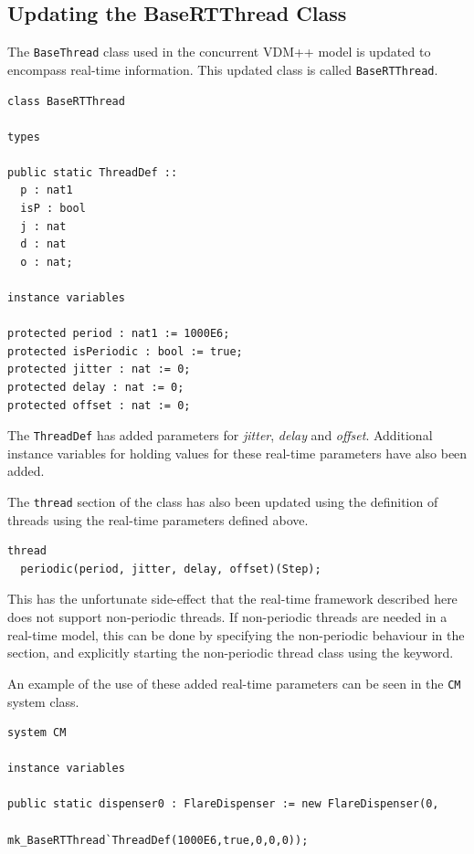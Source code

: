\documentclass{overturerepchap}
\begin{document}
\subsection{Updating the BaseRTThread Class}

The \texttt{BaseThread} class used in the concurrent VDM++ model is updated to encompass real-time information. This updated class is called \texttt{BaseRTThread}.

\begin{lstlisting}
class BaseRTThread

types

public static ThreadDef ::
  p : nat1
  isP : bool
  j : nat
  d : nat
  o : nat;
	
instance variables

protected period : nat1 := 1000E6;
protected isPeriodic : bool := true;
protected jitter : nat := 0;
protected delay : nat := 0;
protected offset : nat := 0;
\end{lstlisting}

The \texttt{ThreadDef} has added parameters for \emph{jitter}, \emph{delay} and \emph{offset}. Additional instance variables for holding values for these real-time parameters have also been added.

The \texttt{thread} section of the class has also been updated using the {\bf{}} definition of threads using the real-time parameters defined above.

\begin{lstlisting}
thread
  periodic(period, jitter, delay, offset)(Step);
\end{lstlisting}

This has the unfortunate side-effect that the real-time framework described here does not support non-periodic threads. If non-periodic threads are needed in a real-time model, this can be done by specifying the non-periodic behaviour in the {\bf{}} section, and explicitly starting the non-periodic thread class using the {\bf{}} keyword.

An example of the use of these added real-time parameters can be seen in the \texttt{CM} system class.

\begin{lstlisting}
system CM

instance variables

public static dispenser0 : FlareDispenser := new FlareDispenser(0, 
                           mk_BaseRTThread`ThreadDef(1000E6,true,0,0,0));
\end{lstlisting}
\end{document}

